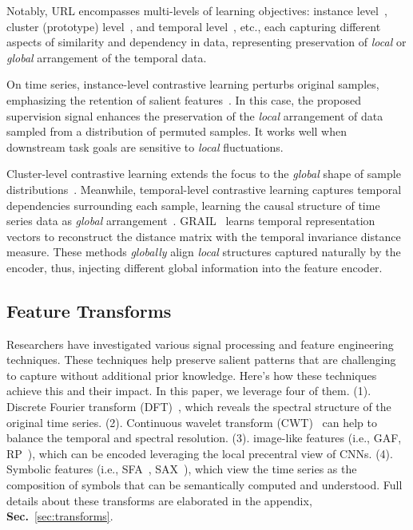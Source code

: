 \documentclass{article}
\begin{document}
Notably, URL encompasses multi-levels of learning objectives: instance level~\cite{chen2020big, oord2018representation,chen2020simple}, cluster (prototype) level~\cite{li2020prototypical, caron2020unsupervised, meng2023mhccl}, and temporal level~\cite{tonekaboni2021unsupervised, eldele2021time, hyvarinen2016unsupervised}, etc., each capturing different aspects of similarity and dependency in data, representing preservation of \textit{local} or \textit{global} arrangement of the temporal data.

On time series, instance-level contrastive learning perturbs original samples, emphasizing the retention of salient features~\cite{yue2022ts2vec}. In this case, the proposed supervision signal enhances the preservation of the \textit{local} arrangement of data sampled from a distribution of permuted samples. It works well when downstream task goals are sensitive to \textit{local} fluctuations. 

Cluster-level contrastive learning extends the focus to the \textit{global} shape of sample distributions~\cite{meng2023mhccl}. Meanwhile, temporal-level contrastive learning captures temporal dependencies surrounding each sample, learning the causal structure of time series data as \textit{global} arrangement~\cite{eldele2021time}. GRAIL~\cite{paparrizos2019grail} learns temporal representation vectors to reconstruct the distance matrix with the temporal invariance distance measure. These methods \textit{globally} align \textit{local} structures captured naturally by the encoder, thus, injecting different global information into the feature encoder.

\subsection{Feature Transforms}\label{sec:transform_main}

Researchers have investigated various signal processing and feature engineering techniques. These techniques help preserve salient patterns that are challenging to capture without additional prior knowledge. Here's how these techniques achieve this and their impact. In this paper, we leverage four of them. (1). Discrete Fourier transform (DFT)~\cite{yang2022unsupervised,winograd1978computing}, which reveals the spectral structure of the original time series. (2). Continuous wavelet transform (CWT)~\cite{grossmann1990reading} can help to balance the temporal and spectral resolution. (3). image-like features (i.e., GAF, RP~\cite{wang2015encoding}), which can be encoded leveraging the local precentral view of CNNs. (4). Symbolic features (i.e., SFA~\cite{tang2020interpretable}, SAX~\cite{notaristefano2013data}), which view the time series as the composition of symbols that can be semantically computed and understood. Full details about these transforms are elaborated in the appendix, \textbf{Sec.}~\ref{sec:transforms}. 
\end{document}
